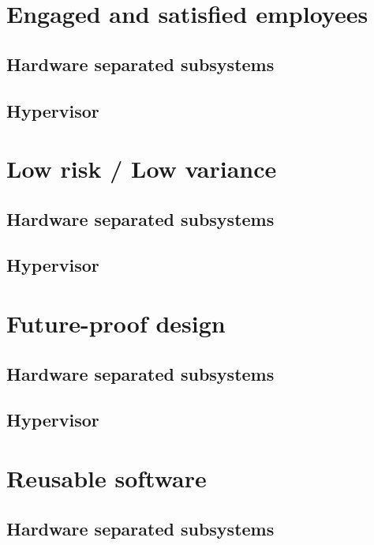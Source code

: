 
\section{Engaged and satisfied employees}
\subsection{Hardware separated subsystems}
\subsection{Hypervisor}


\section{Low risk / Low variance}
\subsection{Hardware separated subsystems}
\subsection{Hypervisor}


\section{Future-proof design}
\subsection{Hardware separated subsystems}
\subsection{Hypervisor}


\section{Reusable software}
\subsection{Hardware separated subsystems}
